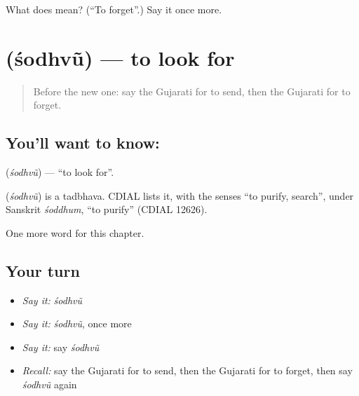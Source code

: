 \begin{tcolorbox}[breakable,colback=teal!4,colframe=teal!35!black,title={Before you move on}]
What does  mean? (\textquotedblleft{}To forget\textquotedblright{}.) Say it once more.
\end{tcolorbox}
\section[\texorpdfstring{\gu{શોધવું} (śodhvũ)}{શોધવું (śodhvũ)}]{ (śodhvũ) — to look for}

\label{lesson:GU-C139-sodhvu}



\begin{quote}
Before the new one: say the Gujarati for to send, then the Gujarati for to forget.
\end{quote}

\subsection*{You'll want to know: }
\textbf{} (\emph{śodhvũ}) — \textquotedblleft{}to look for\textquotedblright{}.

\begin{cousinweb}
\textbf{} (\emph{śodhvũ}) is a tadbhava. CDIAL lists it, with the senses \textquotedblleft{}to purify, search\textquotedblright{}, under Sanskrit \emph{śoddhum}, \textquotedblleft{}to purify\textquotedblright{} (CDIAL 12626).
\end{cousinweb}

\begin{grammarlens}[title={What you've built}]
One more word for this chapter.
\end{grammarlens}

\subsection*{Your turn}
\begin{itemize}
\raggedright
  \item \emph{Say it:} \emph{śodhvũ}
  \item \emph{Say it:} \emph{śodhvũ}, once more
  \item \emph{Say it:} say \emph{śodhvũ}
  \item \emph{Recall:} say the Gujarati for to send, then the Gujarati for to forget, then say \emph{śodhvũ} again
\end{itemize}

